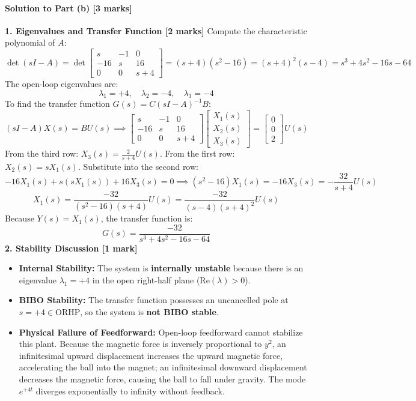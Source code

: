 \documentclass[12pt,onecolumn,twoside ]{article}
\begin{document}
	\paragraph{Solution to Part (b) [3 marks]}
	\textbf{1. Eigenvalues and Transfer Function [2 marks]} Compute the characteristic polynomial of $A$: \[
	\det(sI - A) = \det\begin{bmatrix} s & -1 & 0 \\ -16 & s & 16 \\ 0 & 0 & s + 4 \end{bmatrix} = (s + 4) \left( s^2 - 16 \right) = (s + 4)^2 (s - 4) = s^3 + 4s^2 - 16s - 64
	\] The open-loop eigenvalues are: \[
	\lambda_1 = +4, \quad \lambda_2 = -4, \quad \lambda_3 = -4
	\] To find the transfer function $G(s) = C(sI - A)^{-1} B$: \[
	(sI - A) X(s) = B U(s) \implies \begin{bmatrix} s & -1 & 0 \\ -16 & s & 16 \\ 0 & 0 & s + 4 \end{bmatrix} \begin{bmatrix} X_1(s) \\ X_2(s) \\ X_3(s) \end{bmatrix} = \begin{bmatrix} 0 \\ 0 \\ 2 \end{bmatrix} U(s)
	\] From the third row: $X_3(s) = \frac{2}{s + 4} U(s)$. From the first row: $X_2(s) = s X_1(s)$. Substitute into the second row: \[
	-16 X_1(s) + s(s X_1(s)) + 16 X_3(s) = 0 \implies (s^2 - 16) X_1(s) = -16 X_3(s) = -\frac{32}{s + 4} U(s)
	\] \[
	X_1(s) = \frac{-32}{(s^2 - 16)(s + 4)} U(s) = \frac{-32}{(s - 4)(s + 4)^2} U(s)
	\] Because $Y(s) = X_1(s)$, the transfer function is: \[
	G(s) = \frac{-32}{s^3 + 4s^2 - 16s - 64}
	\]
	\textbf{2. Stability Discussion [1 mark]}
	\begin{itemize}
		\item
		\textbf{Internal Stability:} The system is \textbf{internally unstable} because there is an eigenvalue $\lambda_1 = +4$ in the open right-half plane ($\text{Re}(\lambda) > 0$).
		\item
		\textbf{BIBO Stability:} The transfer function possesses an uncancelled pole at $s = +4 \in \text{ORHP}$, so the system is \textbf{not BIBO stable}.
		\item
		\textbf{Physical Failure of Feedforward:} Open-loop feedforward cannot stabilize this plant. Because the magnetic force is inversely proportional to $y^2$, an infinitesimal upward displacement increases the upward magnetic force, accelerating the ball into the magnet; an infinitesimal downward displacement decreases the magnetic force, causing the ball to fall under gravity. The mode $e^{+4t}$ diverges exponentially to infinity without feedback.
	\end{itemize}
	
\end{document}
